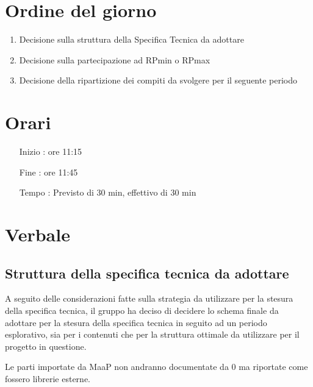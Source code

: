 \documentclass[11pt]{meetingmins}
\begin{document}
\maketitle

\section{Ordine del giorno}

\begin{enumerate}

  \item Decisione sulla struttura della Specifica Tecnica da adottare
  \item Decisione sulla partecipazione ad RPmin o RPmax 
  \item Decisione della ripartizione dei compiti da svolgere per il seguente periodo

\end{enumerate}

\section{Orari}

\begin{itemize}
\item[Inizio]: ore 11:15
\item[Fine]: ore 11:45
\item[Tempo]: Previsto di 30 min, effettivo di 30 min

\end{itemize}

\section{Verbale}

\subsection{Struttura della specifica tecnica da adottare}

A seguito delle considerazioni fatte sulla strategia da utilizzare per la stesura della specifica tecnica, il gruppo ha deciso di decidere lo schema finale da adottare per la stesura della specifica tecnica in seguito ad un periodo esplorativo, sia per i contenuti che per la struttura ottimale da utilizzare per il progetto in questione.

Le parti importate da MaaP non andranno documentate da 0 ma riportate come fossero librerie esterne.
\end{document}

